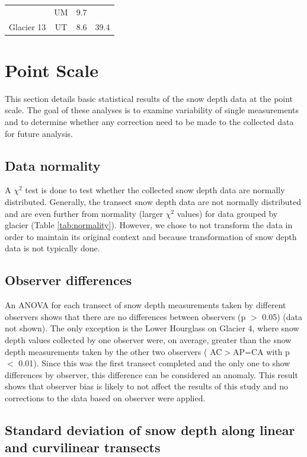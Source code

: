 \documentclass{sfuthesis}
\begin{document}
\begin{appendices}
\begin{table}
\begin{tabular}{cccc}
  & UM & 9.7 &   \\
  
\multirow{-7}{*}{ Glacier 13} & UT & 8.6 & \multirow{-7}{*}{ 39.4}
\end{tabular}
\end{table}

\section{Point Scale}

This section details basic statistical results of the snow depth data at the point scale. The goal of these analyses is to examine variability of single measurements and to determine whether any correction need to be made to the collected data for future analysis. 

\subsection{Data normality}

A $\chi^2$ test is done to test whether the collected snow depth data are normally distributed. Generally, the transect snow depth data are not normally distributed and are even further from normality (larger $\chi^2$ values) for data grouped by glacier (Table \ref{tab:normality}). However, we chose to not transform the data in order to maintain its original context and because transformation of snow depth data is not typically done.  

\subsection{Observer differences}

An ANOVA for each transect of snow depth measurements taken by different observers shows that there are no differences between observers (p $>$ 0.05) (data not shown). The only exception is the Lower Hourglass on Glacier 4, where snow depth values collected by one observer were, on average, greater than the snow depth measurements taken by the other two observers ( AC$>$AP=CA with p $<$ 0.01). Since this was the first transect completed and the only one to show differences by observer, this difference can be considered an anomaly. This result shows that observer bias is likely to not affect the results of this study and no corrections to the data based on observer were applied.

\subsection{Standard deviation of snow depth along linear and curvilinear transects}
\label{sec:stdTransects}


\end{appendices}
\end{document}
